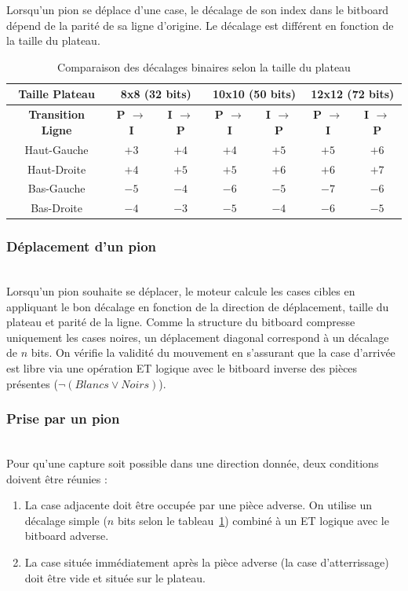 \documentclass[11pt,a4paper]{article}
\begin{document}
Lorsqu'un pion se déplace d'une case, le décalage de son index dans le bitboard dépend de la parité de sa ligne d'origine. Le décalage est différent en fonction de la taille du plateau.

\begin{table}[H]
    \centering
    \caption{Comparaison des décalages binaires selon la taille du plateau}
    \label{tab:comparaison-offsets}
    \begin{tabular}{|c|c|c||c|c||c|c|}
        \hline
        \textbf{Taille Plateau} & \multicolumn{2}{c||}{\textbf{8x8 (32 bits)}} & \multicolumn{2}{c||}{\textbf{10x10 (50 bits)}} & \multicolumn{2}{c|}{\textbf{12x12 (72 bits)}} \\ \hline
        \textbf{Transition Ligne} & \textbf{P $\to$ I} & \textbf{I $\to$ P} & \textbf{P $\to$ I} & \textbf{I $\to$ P} & \textbf{P $\to$ I} & \textbf{I $\to$ P} \\ \hline
        Haut-Gauche & $+3$ & $+4$ & $+4$ & $+5$ & $+5$ & $+6$ \\ \hline
        Haut-Droite & $+4$ & $+5$ & $+5$ & $+6$ & $+6$ & $+7$ \\ \hline
        Bas-Gauche  & $-5$ & $-4$ & $-6$ & $-5$ & $-7$ & $-6$ \\ \hline
        Bas-Droite  & $-4$ & $-3$ & $-5$ & $-4$ & $-6$ & $-5$ \\ \hline
    \end{tabular}
\end{table}

\subsubsection{Déplacement d'un pion} \hfill \\  
    Lorsqu'un pion souhaite se déplacer, le moteur calcule les cases cibles en appliquant le bon décalage en fonction de la direction de déplacement, taille du plateau et parité de la ligne. Comme la structure du bitboard compresse uniquement les cases noires, un déplacement diagonal correspond à un décalage de $n$ bits. On vérifie la validité du mouvement en s'assurant que la case d'arrivée est libre via une opération ET logique avec le bitboard inverse des pièces présentes ($\neg (Blancs \vee Noirs)$).
    
\subsubsection{Prise par un pion} \hfill \\
Pour qu'une capture soit possible dans une direction donnée, deux conditions doivent être réunies :
\begin{enumerate}
    \item La case adjacente doit être occupée par une pièce adverse. On utilise un décalage simple ($n$ bits selon le tableau~\ref{tab:comparaison-offsets}) combiné à un ET logique avec le bitboard adverse.
    \item La case située immédiatement après la pièce adverse (la case d'atterrissage) doit être vide et située sur le plateau.
\end{enumerate}
\end{document}
